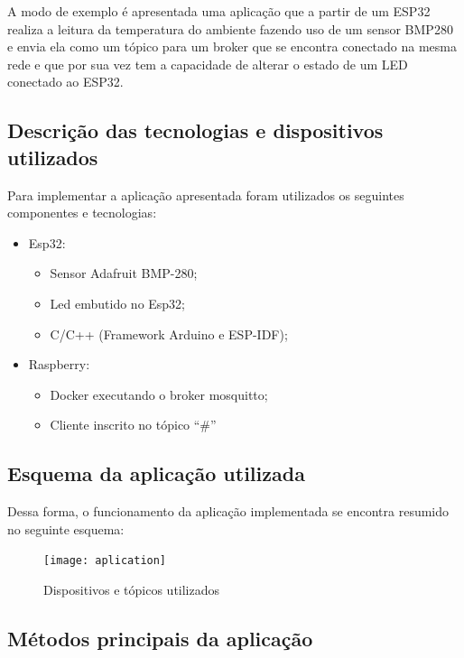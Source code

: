 \documentclass[12pt, a4paper]{article}
\begin{document}
A modo de exemplo é apresentada uma aplicação que a partir de um ESP32 realiza a leitura da temperatura do ambiente fazendo uso de um sensor BMP280 e envia ela como um tópico para um broker que se encontra conectado na mesma rede e que por sua vez tem a capacidade de alterar o estado de um LED conectado ao ESP32.

\subsection{Descrição das tecnologias e dispositivos utilizados}

Para implementar a aplicação apresentada foram utilizados os seguintes componentes e tecnologias:

\begin{itemize}
    \item Esp32:
        \begin{itemize}
            \item Sensor Adafruit BMP-280;
            \item Led embutido no Esp32;
            \item C/C++ (Framework Arduino e ESP-IDF);
        \end{itemize}
    \item Raspberry:
        \begin{itemize}
            \item Docker executando o broker mosquitto;
            \item Cliente inscrito no tópico ``\#''
        \end{itemize}
\end{itemize}

\cleardoublepage

\subsection{Esquema da aplicação utilizada}

Dessa forma, o funcionamento da aplicação implementada se encontra resumido no seguinte esquema:

\begin{figure}[h!]
    \centering
    \texttt{[image: aplication]}
    \caption{\label{fig:aplication} Dispositivos e tópicos utilizados}
\end{figure}

\cleardoublepage

\subsection{Métodos principais da aplicação}
\end{document}
